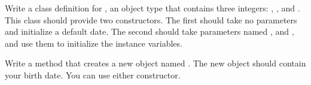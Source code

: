 \begin{exercise}  %

Write a class definition for , an object type that contains three integers: , , and .
This class should provide two constructors.
The first should take no parameters and initialize a default date.
The second should take parameters named ,  and , and use them to initialize the instance variables.

Write a  method that creates a new  object named .
The new object should contain your birth date.
You can use either constructor.

\end{exercise}


